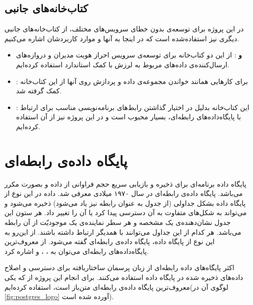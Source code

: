 \subsection{کتاب‌خانه‌‌های جانبی}
در این پروژه برای توسعه‌ی بدون خطای سرویس‌های مختلف، از کتاب‌خانه‌های جانبی دیگری نیز استفاده‌شده است که در اینجا به آنها و موارد کاربردشان اشاره می‌کنیم.
\begin{itemize}

\item \textbf{ و }: از این دو کتاب‌خانه برای توسعه‌ی سرویس احراز هویت مدیران و دروازه‌های ارسال‌کننده‌ی داده‌های مربوط به لرزش با کمک استاندارد  استفاده کرده‌ایم.

\item \textbf{}: برای کارهایی همانند خواندن مجموعه‌ی داده و پردازش روی آنها از این کتاب‌خانه کمک گرفته شد.

\item \textbf{}: این کتاب‌خانه بدلیل در اختیار گذاشتن رابط‌های برنامه‌نویسی مناسب برای ارتباط با پایگاه‌داده‌های رابطه‌ای، بسیار محبوب است و در این پروژه نیز از آن استفاده کرده‌ایم.

\end{itemize}


\section{پایگاه داده‌ی رابطه‌ای}
پایگاه داده برنامه‌ای برای ذخیره و بازیابی سریع حجم فراوانی از داده و بصورت مکرر می‌باشد. پایگاه داده‌ی رابطه‌ای در سال ۱۹۷۰ میلادی معرفی شد. داده در این نوع از پایگاه داده بشکل جداولی (از جدول به عنوان رابطه نیز یاد می‌شود) ذخیره می‌شود و می‌تواند به شکل‌های متفاوت به آن دسترسی پیدا کرد یا آن را تغییر داد. هر ستون این جدول نشان‌دهنده‌ی یک مشخصه و هر سطر نماینده‌ی یک موجودیّت از آن رابطه می‌باشد. هر کدام از این جداول می‌توانند با همدیگر ارتباط داشته‌ باشند. از این‌رو به این نوع از پایگاه داده، پایگاه داده‌ی رابطه‌ای گفته می‌شود\cite{jatana2012survey}. از معروف‌ترین پایگاه‌داده‌های رابطه‌ای می‌توان به ، ،  و  اشاره کرد.

اکثر پایگاه‌های داده رابطه‌ای از زبان پرسمان ساختاریافته برای دسترسی و اصلاح داده‌های ذخیره شده در پایگاه داده استفاده می‌کنند. برای انجام این پروژه از \href{https://www.postgresql.org/}{} که یکی معروف‌ترین پایگاه‌ داده‌ی رابطه‌ای متن‌باز است، استفاده کرده‌ایم(لوگوی آن در \cref{fig:postgres_logo}\cite{postgresqlPostgreSQL} آورده شده است).

